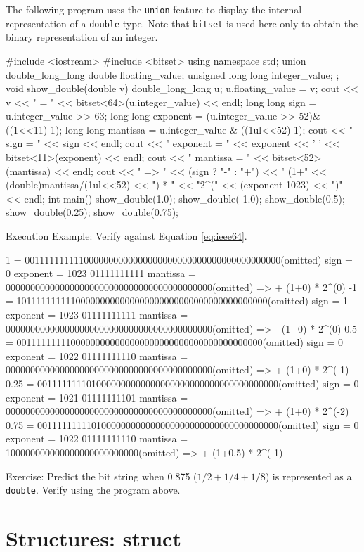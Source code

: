 The following program uses the \texttt{union} feature to display the internal representation of a \texttt{double} type. Note that \texttt{bitset} is used here only to obtain the binary representation of an integer.

\begin{cbox}
#include <iostream>
#include <bitset>
using namespace std;
union double_long_long {
  double floating_value;
  unsigned long long integer_value;
};
void show_double(double v) {
  double_long_long u;
  u.floating_value = v;
  cout << v << " = " << bitset<64>(u.integer_value) << endl;
  long long sign = u.integer_value >> 63;
  long long exponent = (u.integer_value >> 52)& ((1<<11)-1);
  long long mantissa = u.integer_value & ((1ul<<52)-1);
  cout << " sign = " << sign << endl;
  cout << " exponent = " << exponent << ' ' << bitset<11>(exponent) << endl;
  cout << " mantissa = " << bitset<52>(mantissa) << endl;
  cout << " => " << (sign ? "-" : "+")
       << " (1+" << (double)mantissa/(1ul<<52)
       << ") * " << "2^(" << (exponent-1023) << ")" << endl;
}
int main() {
  show_double(1.0);
  show_double(-1.0);
  show_double(0.5);
  show_double(0.25);
  show_double(0.75);
}
\end{cbox}

Execution Example: Verify against Equation \ref{eq:ieee64}.
\begin{terminal}
1 = 0011111111110000000000000000000000000000000000000000(omitted)
 sign = 0
 exponent = 1023 01111111111
 mantissa = 000000000000000000000000000000000000000000(omitted)
 => + (1+0) * 2^(0)
-1 = 101111111111000000000000000000000000000000000000000(omitted)
 sign = 1
 exponent = 1023 01111111111
 mantissa = 000000000000000000000000000000000000000000(omitted)
 => - (1+0) * 2^(0)
0.5 = 00111111111000000000000000000000000000000000000000(omitted)
 sign = 0
 exponent = 1022 01111111110
 mantissa = 000000000000000000000000000000000000000000(omitted)
 => + (1+0) * 2^(-1)
0.25 = 0011111111010000000000000000000000000000000000000(omitted)
 sign = 0
 exponent = 1021 01111111101
 mantissa = 000000000000000000000000000000000000000000(omitted)
 => + (1+0) * 2^(-2)
0.75 = 0011111111101000000000000000000000000000000000000(omitted)
 sign = 0
 exponent = 1022 01111111110
 mantissa = 100000000000000000000000000(omitted)
 => + (1+0.5) * 2^(-1)
\end{terminal}

Exercise: Predict the bit string when 0.875 ($1/2+1/4+1/8$) is represented as a \texttt{double}. Verify using the program above.
\section{Structures: struct}\label{section:struct}


